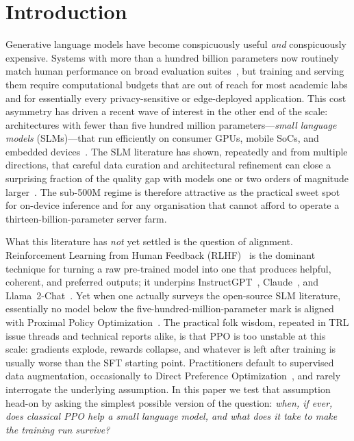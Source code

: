 \documentclass[10pt,twocolumn,letterpaper]{article}
\begin{document}
\begin{abstract}
evaluation scripts, and an interactive verification app are publicly released on Hugging Face and GitHub.
\end{abstract}

\section{Introduction}
\label{sec:intro}

Generative language models have become conspicuously useful \emph{and} conspicuously expensive. Systems with more than a hundred billion parameters now routinely match human performance on broad evaluation suites~\cite{radford2019language,brown2020language,scao2022bloom}, but training and serving them require computational budgets that are out of reach for most academic labs and for essentially every privacy-sensitive or edge-deployed application. This cost asymmetry has driven a recent wave of interest in the other end of the scale: architectures with fewer than five hundred million parameters---\emph{small language models} (SLMs)---that run efficiently on consumer GPUs, mobile SoCs, and embedded devices~\cite{eldan2023tinystories,biderman2023pythia,allal2025smollm2,liu2024mobilellm,lu2024small}. The SLM literature has shown, repeatedly and from multiple directions, that careful data curation and architectural refinement can close a surprising fraction of the quality gap with models one or two orders of magnitude larger~\cite{li2023textbooks,abdin2024phi3,lee2024gemma,qwen2025technical}. The sub-500M regime is therefore attractive as the practical sweet spot for on-device inference and for any organisation that cannot afford to operate a thirteen-billion-parameter server farm.

What this literature has \emph{not} yet settled is the question of alignment. Reinforcement Learning from Human Feedback (RLHF)~\cite{christiano2017deep,ouyang2022training} is the dominant technique for turning a raw pre-trained model into one that produces helpful, coherent, and preferred outputs; it underpins InstructGPT~\cite{ouyang2022training}, Claude~\cite{bai2022training}, and Llama~2-Chat~\cite{touvron2023llama}. Yet when one actually surveys the open-source SLM literature, essentially no model below the five-hundred-million-parameter mark is aligned with Proximal Policy Optimization~\cite{schulman2017proximal}. The practical folk wisdom, repeated in TRL issue threads and technical reports alike, is that PPO is too unstable at this scale: gradients explode, rewards collapse, and whatever is left after training is usually worse than the SFT starting point. Practitioners default to supervised data augmentation, occasionally to Direct Preference Optimization~\cite{rafailov2023direct}, and rarely interrogate the underlying assumption. In this paper we test that assumption head-on by asking the simplest possible version of the question: \emph{when, if ever, does classical PPO help a small language model, and what does it take to make the training run survive?}
\end{document}

